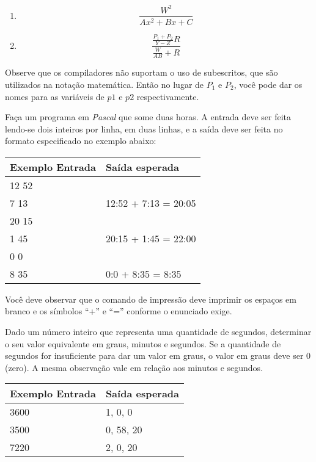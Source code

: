 \begin{enumerate}
\item 
     \[ \frac{W^2}{Ax^2 + Bx +C} \]

\item 
     \[ \frac{\frac{P_1 + P_2}{Y - Z}R}{\frac{W}{AB} + R} \]
\end{enumerate}

\noindent
Observe que os compiladores não suportam o uso de subescritos, que são
utilizados na notação matemática. Então no lugar de $P_1$ e $P_2$, você
pode dar os nomes para as variáveis de $p1$ e $p2$ respectivamente.

\item Faça um programa em \emph{Pascal}
que some duas horas. A entrada deve ser feita lendo-se
dois inteiros por linha, em duas linhas, e a saída
deve ser feita no formato especificado no exemplo
abaixo:

\begin{center}
\begin{tabular}{|l|l|} \hline
Exemplo Entrada & Saída esperada \\ \hline
12 52           &                \\ 
7 13            & 12:52 + 7:13 = 20:05 \\ \hline
20 15           &                \\ 
1 45            & 20:15 + 1:45 = 22:00  \\ \hline
0 0             &                \\ 
8 35            & 0:0 + 8:35 = 8:35  \\ \hline
\end{tabular}
\end{center}

Você deve observar que o comando de impressão deve imprimir os espaços em branco e
os símbolos ``+'' e ``='' conforme o enunciado exige.

\item Dado um número inteiro que representa uma quantidade de segundos,
   determinar o seu valor equivalente em graus, minutos e segundos. Se
   a quantidade de segundos for insuficiente para dar um valor em graus,
   o valor em graus deve ser 0 (zero). A mesma observação vale em
   relação aos minutos e segundos. 

\begin{center}
\begin{tabular}{|l|l|} \hline
Exemplo Entrada & Saída esperada \\ \hline
3600            & 1, 0, 0        \\ \hline
3500            & 0, 58, 20      \\ \hline
7220            & 2, 0, 20       \\ \hline
\end{tabular}
\end{center}

